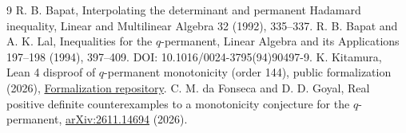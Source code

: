 \documentclass[11pt]{article}
\begin{document}
\begin{thebibliography}{9}
 R. B. Bapat, Interpolating the determinant and permanent Hadamard inequality, Linear and Multilinear Algebra 32 (1992), 335--337.
 R. B. Bapat and A. K. Lal, Inequalities for the $q$-permanent, Linear Algebra and its Applications 197--198 (1994), 397--409. DOI: 10.1016/0024-3795(94)90497-9.
 K. Kitamura, Lean 4 disproof of $q$-permanent monotonicity (order 144), public formalization (2026), \href{https://github.com/KitaKen1/bapat-lal-q-permanent-lean}{Formalization repository}.
 C. M. da Fonseca and D. D. Goyal, Real positive definite counterexamples to a monotonicity conjecture for the $q$-permanent, \href{https://arxiv.org/abs/2611.14694}{arXiv:2611.14694} (2026).
\end{thebibliography}
\end{document}
